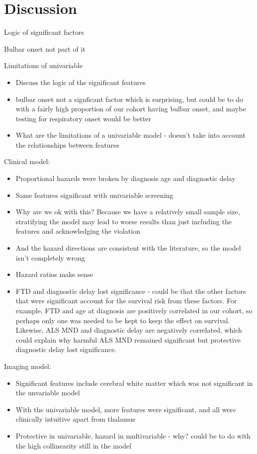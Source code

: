 \section{Discussion}


Logic of significant factors

Bulbar onset not part of it 

Limitations of univariable

\begin{itemize}
    \item Discuss the logic of the significant features
    \item bulbar onset not a signficant factor which is surprising, but could be to do with  a fairly high proportion of our cohort having bulbar onset, and maybe testing for respiratory onset would be better
    \item What are the limitations of a univariable model - doesn't take into account the relationships between features
\end{itemize}

Clinical model:



\begin{itemize}
    \item Proportional hazards were broken by diagnosis age and diagnostic delay
    \item Same features significant with univariable screening
    \item Why are we ok with this? Because we have a relatively small sample size, stratifying the model may lead to worse results than just including the features and acknowledging the violation
    \item And the hazard directions are consistent with the literature, so the model isn't completely wrong
    \item Hazard ratios make sense
    \item FTD and diagnostic delay lost significance - could be that the other factors that were significant account for the survival risk from these factors. For example, FTD and age at diagnosis are positively correlated in our cohort, so perhaps only one was needed to be kept to keep the effect on survival. Likewise, ALS MND and diagnostic delay are negatively correlated, which could explain why harmful ALS MND remained significant but protective diagnostic delay lost significance.
\end{itemize}

Imaging model:
\begin{itemize}
    \item Significant features include cerebral white matter which was not significant in the unvariable model
    \item With the univariable model, more features were significant, and all were clinically intuitive apart from thalamus
    \item Protective in univariable, hazard in multivariable - why? could be to do with the high collinearity still in the model
\end{itemize}

